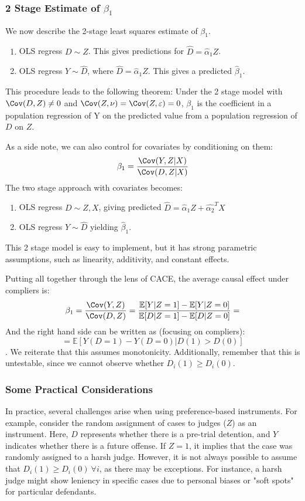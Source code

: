 \subsubsection{2 Stage Estimate of $\beta_1$}
We now describe the 2-stage least squares estimate of $\beta_1$.

\begin{enumerate}
    \item OLS regress $D \sim Z$. This gives predictions for $\hat{D} = \hat{\alpha}_1 Z$.
    \item OLS regress $Y \sim \hat{D}$, where $\hat{D} = \hat{\alpha}_1Z$. This gives a predicted $\hat{\beta}_1$.
\end{enumerate}

This procedure leads to the following theorem: Under the 2 stage model with $\Cov(D,Z) \neq 0$ and $\Cov(Z,\nu) = \Cov(Z,\varepsilon) = 0$, $\beta_1$ is the coefficient in a population regression of Y on the predicted value from a population regression of $D$ on $Z$.

As a side note, we can also control for covariates by conditioning on them:
$$\beta_1 = \frac{\Cov(Y, Z | X) }{\Cov(D, Z | X)}$$
The two stage approach with covariates becomes:
\begin{enumerate}
    \item OLS regress $D \sim Z, X$, giving predicted $\hat{D} = \hat{\alpha}_1 Z + \hat{\alpha_2}^T X$
    \item OLS regress $Y \sim \hat{D}$ yielding $\hat{\beta}_1$. 

\end{enumerate}
This 2 stage model is easy to implement, but it has strong parametric assumptions, such as linearity, additivity, and constant effects.

Putting all together through the lens of CACE, the average causal effect under compliers is:
$$\beta_1 = \frac{\Cov(Y, Z ) }{\Cov(D, Z )} = \frac{\mathbb{E} [Y | Z = 1] - \mathbb{E} [Y | Z = 0]}{\mathbb{E} [D | Z = 1] - \mathbb{E} [D | Z = 0]} = $$
And the right hand side can be written as (focusing on compliers):
$$= \mathbb{E} [Y(D=1) - Y(D=0) | D(1) > D(0)]$$.
We reiterate that this assumes monotonicity. Additionally, remember that this is untestable, since we cannot observe whether $D_i(1) \geq D_i(0)$.

\subsubsection{Some Practical Considerations}  
In practice, several challenges arise when using preference-based instruments. For example, consider the random assignment of cases to judges (\(Z\)) as an instrument. Here, \(D\) represents whether there is a pre-trial detention, and \(Y\) indicates whether there is a future offense. If \(Z = 1\), it implies that the case was randomly assigned to a harsh judge. However, it is not always possible to assume that \(D_i(1) \geq D_i(0) \ \forall i\), as there may be exceptions. For instance, a harsh judge might show leniency in specific cases due to personal biases or "soft spots" for particular defendants.  

